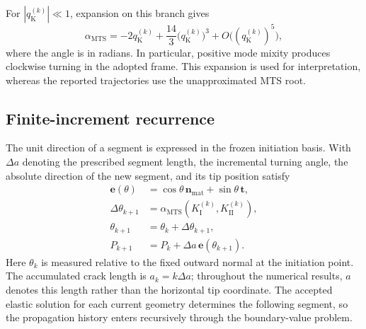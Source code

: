 \documentclass[11pt]{article}
\begin{document}
For $|q_{\mathrm{K}}^{(k)}|\ll1$, expansion on this branch gives
\begin{equation}
 \alpha_{\mathrm{MTS}}
 =-2q_{\mathrm{K}}^{(k)}
  +\frac{14}{3}\bigl(q_{\mathrm{K}}^{(k)}\bigr)^3
  +O\bigl((q_{\mathrm{K}}^{(k)})^5\bigr),
 \label{eq:mts-small-mixity}
\end{equation}
where the angle is in radians. In particular, positive mode mixity
produces clockwise turning in the adopted frame. This expansion is
used for interpretation, whereas the reported trajectories use the
unapproximated MTS root.

\subsection{Finite-increment recurrence}
The unit direction of a segment is expressed in the frozen initiation
basis. With $\Delta a$ denoting the prescribed segment length, the
incremental turning angle, the absolute direction of the new segment,
and its tip position satisfy
\begin{align}
 \bm e(\theta)&=\cos\theta\,\bm n_{\mathrm{mat}}
                 +\sin\theta\,\bm t,\label{eq:direction}\\
 \Delta\theta_{k+1}
   &=\alpha_{\mathrm{MTS}}(K_{\mathrm{I}}^{(k)},K_{\mathrm{II}}^{(k)}),
     \label{eq:turn}\\
 \theta_{k+1}&=\theta_k+\Delta\theta_{k+1},\label{eq:angleupdate}\\
 P_{k+1}&=P_k+\Delta a\,\bm e(\theta_{k+1}).\label{eq:pointupdate}
\end{align}
Here $\theta_k$ is measured relative to the fixed outward normal at
the initiation point. The accumulated crack length is
$a_k=k\Delta a$; throughout the numerical results, $a$ denotes
this length rather than the horizontal tip coordinate. The accepted
elastic solution for each current geometry determines the following
segment, so the propagation history enters recursively through the
boundary-value problem.
\end{document}

